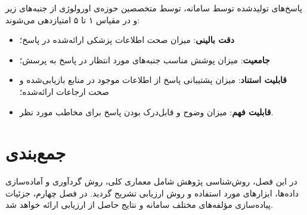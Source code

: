 پاسخ‌های تولیدشده توسط سامانه، توسط متخصصین حوزه‌ی اورولوژی از جنبه‌های زیر و در مقیاس ۱ تا ۵ امتیازدهی می‌شوند:

\begin{itemize}

\item \textbf{دقت بالینی}: میزان صحت اطلاعات پزشکی ارائه‌شده در پاسخ؛

\item \textbf{جامعیت}: میزان پوشش مناسب جنبه‌های مورد انتظار در پاسخ
به پرسش؛

\item \textbf{قابلیت استناد}: میزان پشتیبانی پاسخ از اطلاعات موجود
در منابع بازیابی‌شده و صحت ارجاعات ارائه‌شده؛

\item \textbf{قابلیت فهم}: میزان وضوح و قابل‌درک بودن پاسخ برای
مخاطب مورد نظر.

\end{itemize}


\section{جمع‌بندی}

در این فصل، روش‌شناسی پژوهش شامل معماری کلی، روش گردآوری و آماده‌سازی داده‌ها، ابزارهای مورد استفاده و روش ارزیابی تشریح گردید. در فصل چهارم، جزئیات پیاده‌سازی مؤلفه‌های مختلف سامانه و نتایج حاصل از ارزیابی ارائه خواهد شد.
